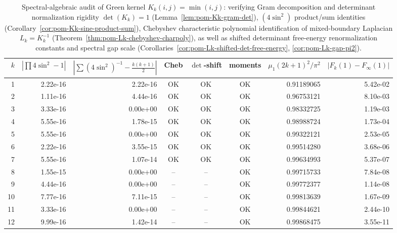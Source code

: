 \begin{table}[H]
\centering
\scriptsize
\setlength{\tabcolsep}{6pt}
\caption{Spectral-algebraic audit of Green kernel $K_k(i,j)=\min(i,j)$: verifying Gram decomposition and determinant normalization rigidity $\det(K_k)=1$ (Lemma~\ref{lem:pom-Kk-gram-det}), $(4\sin^2)$ product/sum identities (Corollary~\ref{cor:pom-Kk-sine-product-sum}), Chebyshev characteristic polynomial identification of mixed-boundary Laplacian $L_k=K_k^{-1}$ (Theorem~\ref{thm:pom-Lk-chebyshev-charpoly}), as well as shifted determinant free-energy renormalization constants and spectral gap scale (Corollaries~\ref{cor:pom-Lk-shifted-det-free-energy}, \ref{cor:pom-Lk-gap-pi2}).}
\label{tab:fence_green_kernel_spectral_algebra_audit}
\begin{tabular}{r r r c c c r r}
\toprule
$k$ & $|\prod 4\sin^2-1|$ & $|\sum (4\sin^2)^{-1}-\tfrac{k(k+1)}{2}|$ & Cheb & $\det$-shift & moments & $\mu_1(2k+1)^2/\pi^2$ & $|F_k(1)-F_\infty(1)|$\\
\midrule
1 & 2.22e-16 & 2.22e-16 & OK & OK & OK & 0.91189065 & 5.42e-02\\
2 & 1.11e-16 & 4.44e-16 & OK & OK & OK & 0.96753121 & 8.10e-03\\
3 & 3.33e-16 & 0.00e+00 & OK & OK & OK & 0.98332725 & 1.19e-03\\
4 & 5.55e-16 & 1.78e-15 & OK & OK & OK & 0.98988724 & 1.73e-04\\
5 & 5.55e-16 & 0.00e+00 & OK & OK & OK & 0.99322121 & 2.53e-05\\
6 & 2.22e-16 & 3.55e-15 & OK & OK & OK & 0.99514280 & 3.68e-06\\
7 & 5.55e-16 & 1.07e-14 & OK & OK & OK & 0.99634993 & 5.37e-07\\
8 & 1.55e-15 & 0.00e+00 & -- & -- & OK & 0.99715733 & 7.84e-08\\
9 & 4.44e-16 & 0.00e+00 & -- & -- & OK & 0.99772377 & 1.14e-08\\
10 & 7.77e-16 & 7.11e-15 & -- & -- & OK & 0.99813639 & 1.67e-09\\
11 & 3.33e-16 & 0.00e+00 & -- & -- & OK & 0.99844621 & 2.44e-10\\
12 & 9.99e-16 & 1.42e-14 & -- & -- & OK & 0.99868475 & 3.55e-11\\
\bottomrule
\end{tabular}
\end{table}
